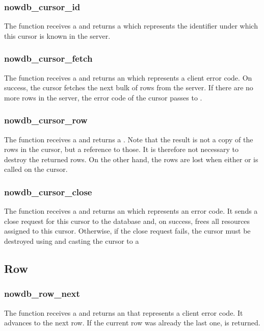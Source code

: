 \subsubsection{nowdb\_cursor\_id}
The function receives a 
and returns a  which
represents the identifier under which this
cursor is known in the server.

\subsubsection{nowdb\_cursor\_fetch}
The function receives a 
and returns an  which
represents a client error code.
On success, the cursor fetches the next
bulk of rows from the server.
If there are no more rows in the server,
the error code of the cursor passes to .

\subsubsection{nowdb\_cursor\_row}
The function receives a 
and returns a .
Note that the result is not a copy
of the rows in the cursor, but a reference
to those.
It is therefore not necessary to destroy
the returned rows.
On the other hand, the rows are lost
when either  or 
is called on the cursor. 

\subsubsection{nowdb\_cursor\_close}
The function receives a 
and returns an  which represents an
error code.
It sends a close request for this cursor
to the database and, on success,
frees all resources assigned to this cursor.
Otherwise, if the close request fails,
the cursor must be destroyed using 
 and
casting the cursor to a 

\subsection{Row}
\subsubsection{nowdb\_row\_next}
The function receives a 
and returns an  that represents
a client error code.
It advances to the next row.
If the current row was already the last one,
 is returned.


